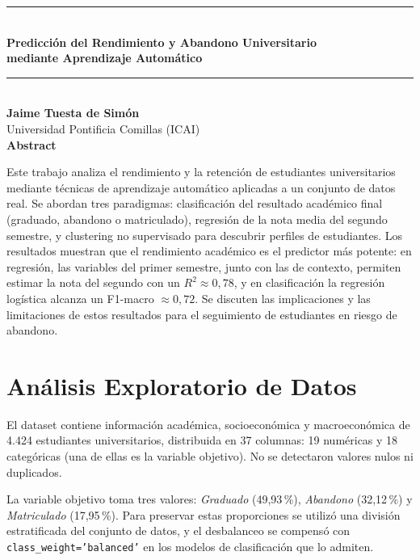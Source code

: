 \documentclass[11pt,letterpaper]{article}
\newcommand{\code}[1]{\texttt{#1}}
\begin{document}
\begin{center}
\rule{\linewidth}{1.2pt}\\[8pt]
{\LARGE\bfseries Predicción del Rendimiento y Abandono Universitario\\[2pt] mediante Aprendizaje Automático}\\[8pt]
\rule{\linewidth}{0.6pt}\\[12pt]
{\bfseries Jaime Tuesta de Simón}\\
Universidad Pontificia Comillas (ICAI)\\[14pt]
\textbf{Abstract}\\[4pt]
\begin{minipage}{0.88\linewidth}
\small\hspace{1.2em}Este trabajo analiza el rendimiento y la retención de estudiantes universitarios mediante técnicas de aprendizaje automático aplicadas a un conjunto de datos real. Se abordan tres paradigmas: clasificación del resultado académico final (graduado, abandono o matriculado), regresión de la nota media del segundo semestre, y clustering no supervisado para descubrir perfiles de estudiantes. Los resultados muestran que el rendimiento académico es el predictor más potente: en regresión, las variables del primer semestre, junto con las de contexto, permiten estimar la nota del segundo con un $R^2 \approx 0{,}78$, y en clasificación la regresión logística alcanza un F1-macro $\approx 0{,}72$. Se discuten las implicaciones y las limitaciones de estos resultados para el seguimiento de estudiantes en riesgo de abandono.
\end{minipage}
\end{center}

\section{Análisis Exploratorio de Datos}

El dataset contiene información académica, socioeconómica y macroeconómica de 4.424 estudiantes universitarios, distribuida en 37 columnas: 19 numéricas y 18 categóricas (una de ellas es la variable objetivo). No se detectaron valores nulos ni duplicados.

La variable objetivo toma tres valores: \emph{Graduado} (49,93\,\%), \emph{Abandono} (32,12\,\%) y \emph{Matriculado} (17,95\,\%). Para preservar estas proporciones se utilizó una división estratificada del conjunto de datos, y el desbalanceo se compensó con \code{class\_weight='balanced'} en los modelos de clasificación que lo admiten.
\end{document}
